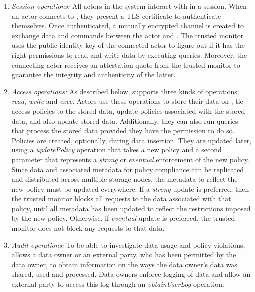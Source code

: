 \begin{enumerate}[wide=0pt]
\item \vspace{3pt} {\em Session operations:}
All actors in the system interact with \project{} in a session. When an actor connects to \project{}, they present a TLS certificate to authenticate themselves. Once authenticated, a mutually encrypted channel is created to exchange data and commands between the actor and \project{}. The trusted monitor uses the public identity key of the connected actor to figure out if it has the right permissions to read and write data by executing queries. Moreover, the connecting actor receives an attestation quote from the trusted monitor to guarantee the integrity and authenticity of the latter.

\item \vspace{3pt} {\em Access operations:}
As described below, \project{} supports three kinds of operations: \textit{read}, \textit{write} and \textit{exec}. Actors use these operations to store their data on \project{}, tie access policies to the stored data, update policies associated with the stored data, and also update stored data. Additionally, they can also run queries that process the stored data provided they have the permission to do so. Policies are created, optionally, during data insertion. They are updated later, using a \emph{updatePolicy} operation that takes a new policy and a second parameter that represents a \emph{strong} or \emph{eventual} enforcement of the new policy. Since data and associated metadata for policy compliance can be replicated and distributed across multiple storage nodes, the metadata to reflect the new policy must be updated everywhere. If a \emph{strong} update is preferred, then the trusted monitor blocks all requests to the data associated with that policy, until all metadata has been updated to reflect the restrictions imposed by the new policy. Otherwise, if \emph{eventual} update is preferred, the trusted monitor does not block any requests to that data.

\item \vspace{3pt} {\em Audit operations:}
To be able to investigate data usage and policy violations, \project{} allows a data owner or an external party, who has been permitted by the data owner, to obtain information on the ways the data owner's data was shared, used and processed. Data owners enforce logging of data and allow an external party to access this log through an \emph{obtainUserLog} operation.
\end{enumerate}

